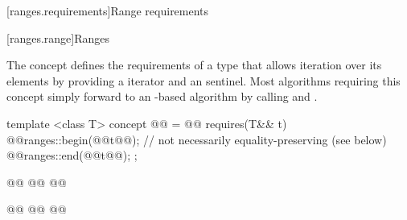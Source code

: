 \setcounter{section}{6}
[ranges.requirements]{Range requirements}

\setcounter{subsection}{1}
[ranges.range]{Ranges}

\pnum
The  concept defines the requirements of a type that allows
iteration over its elements by providing a  iterator and an
 sentinel.
\enternote Most algorithms requiring this concept simply forward to an
-based algorithm by calling  and . \exitnote

\begin{itemdecl}
template <class T>
concept @@ = @\added{// \expos}@
  requires(T&& t) {
    @@ranges::begin(@@t@\added{)}@); // not necessarily equality-preserving (see below)
    @@ranges::end(@@t@\added{)}@);
  };

@@
@@
  @@

@@
@@
  @@
\end{itemdecl}

